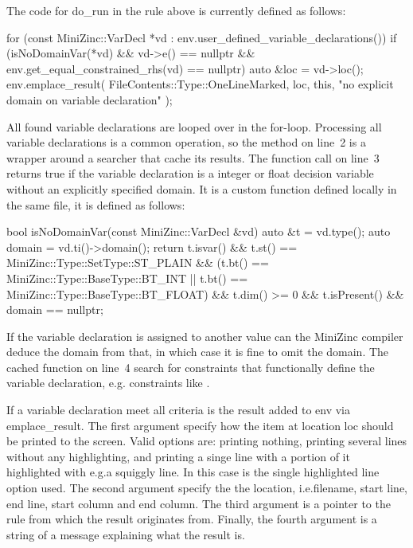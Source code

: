 \documentclass[a4paper,12pt]{article}
\newcommand{\mi}[1]{\mbox{\mzninline{#1}}}
\newcommand{\cpp}[1]{\mbox{\mznfont #1}}
\begin{document}
The code for \cpp{do\_run} in the rule above is currently defined as follows:
\begin{cppp}
for (const MiniZinc::VarDecl *vd
     : env.user_defined_variable_declarations()) {
  if (isNoDomainVar(*vd) && vd->e() == nullptr &&
      env.get_equal_constrained_rhs(vd) == nullptr)
  {
    auto &loc = vd->loc();
    env.emplace_result(
      FileContents::Type::OneLineMarked, loc, this,
      "no explicit domain on variable declaration"
    );
  }
}
\end{cppp}
All found variable declarations are looped over in the for-loop. Processing all variable
declarations is a common operation, so the method on line~2 is a wrapper around a searcher
that cache its results. The function call on line~3 returns true if the variable declaration is
a integer or float decision variable without an explicitly specified domain. It is a custom function
defined locally in the same file, it is defined as follows:
\begin{cppp}[style=nonumbers]
bool isNoDomainVar(const MiniZinc::VarDecl &vd) {
  auto &t = vd.type();
  auto domain = vd.ti()->domain();
  return t.isvar()
    && t.st() == MiniZinc::Type::SetType::ST_PLAIN
    && (t.bt() == MiniZinc::Type::BaseType::BT_INT ||
        t.bt() == MiniZinc::Type::BaseType::BT_FLOAT)
    && t.dim() >= 0
    && t.isPresent()
    && domain == nullptr;
}
\end{cppp}

If the variable declaration is assigned to another value can the MiniZinc compiler deduce the
domain from that, in which case it is fine to omit the domain. The cached function on line~4
search for constraints that functionally define the variable declaration, e.g.\@
constraints like \mi{constraint x=2}.

\begin{sloppypar}
If a variable declaration meet all criteria is the result added to \cpp{env} via
\cpp{emplace\_result}. The first argument specify how the item at location \cpp{loc} should be
printed to the screen. Valid options are: printing nothing, printing several lines without
any highlighting, and printing a singe line with a portion of it highlighted with e.g.\@ a
squiggly line. In this case is the single highlighted line option used. The second
argument specify the the location, i.e.\@ filename, start line, end line, start column and end
column. The third argument is a pointer to the rule from which the result originates from.
Finally, the fourth argument is a string of a message explaining what the result is.
\end{sloppypar}
\end{document}
